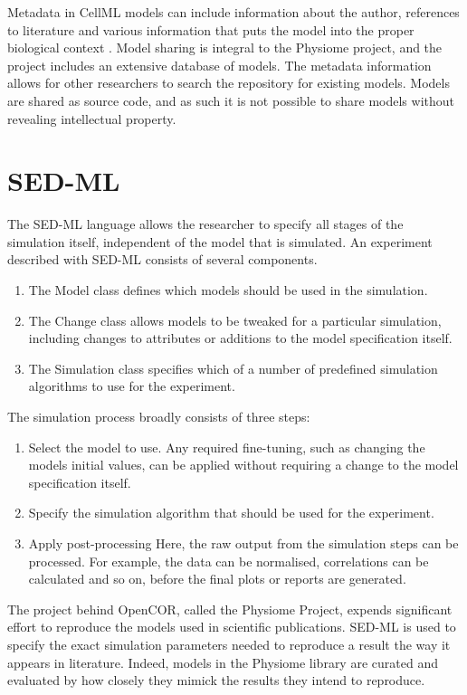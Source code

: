 \documentclass[\rootfolder/main.tex]{subfiles}
\begin{document}
Metadata in CellML models can include information about the author, references to literature and various information that puts the model into the proper biological context \cite{cuellar2003}.
Model sharing is integral to the Physiome project, and the project includes an extensive database of models.
The metadata information allows for other researchers to search the repository for existing models.
Models are shared as source code, and as such it is not possible to share models without revealing intellectual property.

\section{SED-ML}

The SED-ML language allows the researcher to specify all stages of the simulation itself, independent of the model that is simulated.
An experiment described with SED-ML consists of several components.

\begin{enumerate}
    \item The Model class defines which models should be used in the simulation.
    \item The Change class allows models to be tweaked for a particular simulation, including changes to attributes or additions to the model specification itself.
    \item The Simulation class specifies which of a number of predefined simulation algorithms to use for the experiment. \cite{sedml-specification}
\end{enumerate}

The simulation process broadly consists of three steps:

\begin{enumerate}
    \item Select the model to use. Any required fine-tuning, such as changing the models initial values, can be applied without requiring a change to the model specification itself.
    \item Specify the simulation algorithm that should be used for the experiment.
    \item Apply post-processing
        Here, the raw output from the simulation steps can be processed. For example, the data can be normalised,
        correlations can be calculated and so on, before the final plots or reports are generated.
\end{enumerate}

The project behind OpenCOR, called the Physiome Project, expends significant effort to reproduce the models used in scientific publications.
SED-ML is used to specify the exact simulation parameters needed to reproduce a result the way it appears in literature.
Indeed, models in the Physiome library are curated and evaluated by how closely they mimick the results they intend to reproduce.
\end{document}
